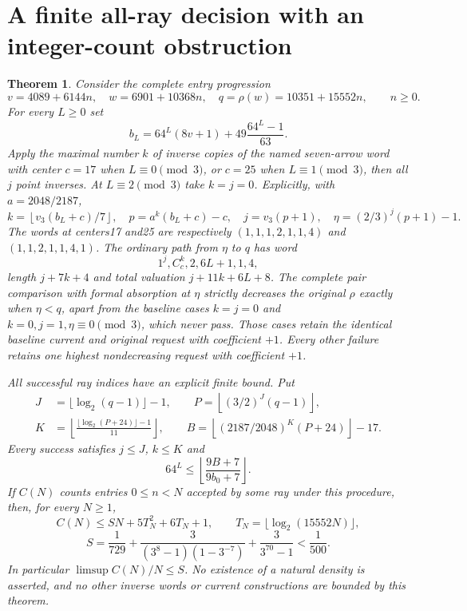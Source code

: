 \documentclass[11pt]{article}
\newtheorem{theorem}{Theorem}
\begin{document}
\section{A finite all-ray decision with an integer-count obstruction}
\begin{theorem}\label{thm:allrays}
Consider the complete entry progression
\[
 v=4089+6144n,\quad w=6901+10368n,\quad
 q=\rho(w)=10351+15552n,\qquad n\ge0.
\]
For every $L\ge0$ set
\[
 b_L=64^L(8v+1)+49\frac{64^L-1}{63}.
\]
Apply the maximal number $k$ of inverse copies of the named seven-arrow
word with center $c=17$ when $L\equiv0\pmod3$, or $c=25$ when
$L\equiv1\pmod3$, then all $j$ point inverses. At $L\equiv2\pmod3$
take $k=j=0$. Explicitly, with $a=2048/2187$,
\[
 k=\left\lfloor v_3(b_L+c)/7\right\rfloor,\quad
 p=a^k(b_L+c)-c,\quad j=v_3(p+1),\quad
 \eta=(2/3)^j(p+1)-1.
\]
The words at centers17 and25 are respectively
$(1,1,1,2,1,1,4)$ and $(1,1,2,1,1,4,1)$.
The ordinary path from $\eta$ to $q$ has word
\[
 1^j,C_c^k,2,6L+1,1,4,
\]
length $j+7k+4$ and total valuation $j+11k+6L+8$.
The complete pair comparison with formal absorption at $\eta$ strictly
decreases the original $\rho$ exactly when $\eta<q$, apart from the
baseline cases $k=j=0$ and $k=0,j=1,\eta\equiv0\pmod3$, which never pass.
Those cases retain the identical baseline current and original request
with coefficient $+1$. Every other failure retains one highest
nondecreasing request with coefficient $+1$.

All successful ray indices have an explicit finite bound. Put
\[
 \begin{split}
 J&=\lfloor\log_2(q-1)\rfloor-1,\qquad
 P=\left\lfloor(3/2)^J(q-1)\right\rfloor,\\
 K&=\left\lfloor\frac{\lfloor\log_2(P+24)\rfloor-1}{11}\right\rfloor,
 \qquad
 B=\left\lfloor(2187/2048)^K(P+24)\right\rfloor-17.
 \end{split}
\]
Every success satisfies $j\le J$, $k\le K$ and
\[
 64^L\le\left\lfloor\frac{9B+7}{9b_0+7}\right\rfloor.
\]
If $C(N)$ counts entries $0\le n<N$ accepted by some ray under this
procedure, then, for every $N\ge1$,
\[
 C(N)\le S N+5T_N^2+6T_N+1,\qquad
 T_N=\lfloor\log_2(15552N)\rfloor,
\]
\[
 S=\frac1{729}
   +\frac3{(3^8-1)(1-3^{-7})}
   +\frac3{3^{70}-1}<\frac1{500}.
\]
In particular $\limsup C(N)/N\le S$. No existence of a natural density
is asserted, and no other inverse words or current constructions are
bounded by this theorem.
\end{theorem}
\end{document}
